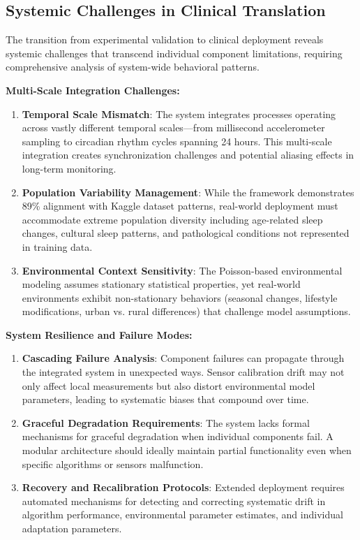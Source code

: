 \documentclass[conference]{IEEEtran}
\begin{document}
\subsection{Systemic Challenges in Clinical Translation}
The transition from experimental validation to clinical deployment reveals systemic challenges that transcend individual component limitations, requiring comprehensive analysis of system-wide behavioral patterns.

\textbf{Multi-Scale Integration Challenges:}
\begin{enumerate}
    \item \textbf{Temporal Scale Mismatch}: The system integrates processes operating across vastly different temporal scales—from millisecond accelerometer sampling to circadian rhythm cycles spanning 24 hours. This multi-scale integration creates synchronization challenges and potential aliasing effects in long-term monitoring.
    
    \item \textbf{Population Variability Management}: While the framework demonstrates 89\% alignment with Kaggle dataset patterns, real-world deployment must accommodate extreme population diversity including age-related sleep changes, cultural sleep patterns, and pathological conditions not represented in training data.
    
    \item \textbf{Environmental Context Sensitivity}: The Poisson-based environmental modeling assumes stationary statistical properties, yet real-world environments exhibit non-stationary behaviors (seasonal changes, lifestyle modifications, urban vs. rural differences) that challenge model assumptions.
\end{enumerate}

\textbf{System Resilience and Failure Modes:}
\begin{enumerate}
    \item \textbf{Cascading Failure Analysis}: Component failures can propagate through the integrated system in unexpected ways. Sensor calibration drift may not only affect local measurements but also distort environmental model parameters, leading to systematic biases that compound over time.
    
    \item \textbf{Graceful Degradation Requirements}: The system lacks formal mechanisms for graceful degradation when individual components fail. A modular architecture should ideally maintain partial functionality even when specific algorithms or sensors malfunction.
    
    \item \textbf{Recovery and Recalibration Protocols}: Extended deployment requires automated mechanisms for detecting and correcting systematic drift in algorithm performance, environmental parameter estimates, and individual adaptation parameters.
\end{enumerate}
\end{document}
